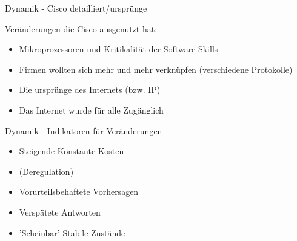 \begin{frame}[c]{Dynamik - Cisco detailliert/ursprünge}
    \Large

    Veränderungen die Cisco ausgenutzt hat:
    \begin{itemize}
        \item Mikroprozessoren und Kritikalität der Software-Skills
            \pause
        \item Firmen wollten sich mehr und mehr verknüpfen (verschiedene Protokolle)
            \pause
        \item Die ursprünge des Internets (bzw. IP)
            \pause
        \item Das Internet wurde für alle Zugänglich
    \end{itemize}


\end{frame}


\begin{frame}[c]{Dynamik - Indikatoren für Veränderungen}
    \Large

    \begin{itemize}
        \item Steigende Konstante Kosten
            \pause
        \item (Deregulation)
            \pause
        \item Vorurteilsbehaftete Vorhersagen
            \pause
        \item Verspätete Antworten
            \pause
        \item 'Scheinbar' Stabile Zustände
    \end{itemize}
\end{frame}



